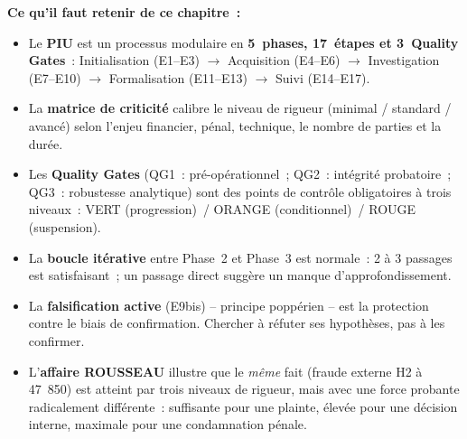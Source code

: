 \begin{boxresume}
\textbf{Ce qu'il faut retenir de ce chapitre~:}
\begin{itemize}
    \item Le \textbf{PIU} est un processus modulaire en \textbf{5~phases,
          17~étapes et 3~Quality Gates}~: Initialisation (E1--E3) $\to$
          Acquisition (E4--E6) $\to$ Investigation (E7--E10) $\to$
          Formalisation (E11--E13) $\to$ Suivi (E14--E17).

    \item La \textbf{matrice de criticité} calibre le niveau de rigueur (minimal
          / standard / avancé) selon l'enjeu financier, pénal, technique,
          le nombre de parties et la durée.

    \item Les \textbf{Quality Gates} (QG1~: pré-opérationnel~;
          QG2~: intégrité probatoire~; QG3~: robustesse analytique) sont
          des points de contrôle obligatoires à trois niveaux~:
          VERT (progression)~/ ORANGE (conditionnel)~/ ROUGE (suspension).

    \item La \textbf{boucle itérative} entre Phase~2 et Phase~3 est normale~:
          2 à 3 passages est satisfaisant~; un passage direct suggère un
          manque d'approfondissement.

    \item La \textbf{falsification active} (E9bis) -- principe poppérien --
          est la protection contre le biais de confirmation. Chercher à
          réfuter ses hypothèses, pas à les confirmer.

    \item L'\textbf{affaire ROUSSEAU} illustre que le \emph{même} fait
          (fraude externe H2 à 47~850) est atteint par trois niveaux de
          rigueur, mais avec une force probante radicalement différente~:
          suffisante pour une plainte, élevée pour une décision interne,
          maximale pour une condamnation pénale.
\end{itemize}
\end{boxresume}

\bigskip

